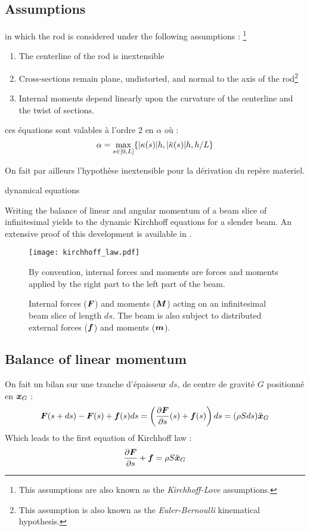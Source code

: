 \subsection{Assumptions}

in which the rod is considered under the following assumptions : \footnote{This assumptions are also known as the \emph{Kirchhoff-Love} assumptions.}
\begin{enumerate}
\item The centerline of the rod is inextensible
\item Cross-sections remain plane, undistorted, and normal to the axis of the rod\footnote{This assumption is also known as the \emph{Euler-Bernoulli} kinematical hypothesis.}
\item Internal moments depend linearly upon the curvature of the centerline and the twist of sections.
\end{enumerate}



ces équations sont valables à l'ordre 2 en $\alpha$ où :
\begin{equation}
	\alpha = \max_{s \in [0,L]} \{ \abs{\kappa(s)} h, \abs{\overbar{\kappa}(s)} h, h/L\}
\end{equation}

On fait par ailleurs l'hypothèse inextensible pour la dérivation du repère materiel.

dynamical equations

Writing the balance of linear and angular momentum of a beam slice of infinitesimal yields to the dynamic Kirchhoff equations for a slender beam. An extensive proof of this development is available in \cite{Dill1992}.



\begin{figure}[t]
	\centering
	\texttt{[image: kirchhoff\_law.pdf]}
	\caption{Internal forces ($\boldsymbol{F}$) and moments ($\boldsymbol{M}$) acting on an infinitesimal beam slice of length $ds$. The beam is also subject to distributed external forces ($\boldsymbol{f}$) and moments ($\boldsymbol{m}$).} By convention, internal forces and moments are forces and moments applied by the right part to the left part of the beam.
	\label{fig:5_0}
\end{figure}

\subsection{Balance of linear momentum}
On fait un bilan sur une tranche d'épaisseur $ds$, de centre de gravité $G$ positionné en $\boldsymbol{x}_G$ :
\begin{equation}
	\boldsymbol{F}(s+ds)-\boldsymbol{F}(s) + \boldsymbol{f}(s)ds = \left(\frac{\partial \boldsymbol{F}}{\partial s}(s)+\boldsymbol{f}(s)\right)ds = (\rho Sds)\ddot{\boldsymbol{x}}_G
\end{equation}
Which leads to the first equation of Kirchhoff law :
\begin{equation}
	\frac{\partial \boldsymbol{F}}{\partial s}+\boldsymbol{f} = \rho S \ddot{\boldsymbol{x}}_G
\end{equation}

